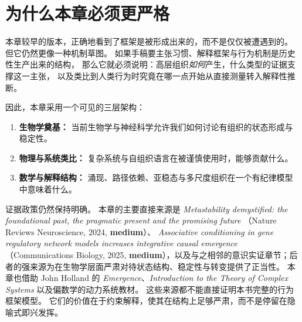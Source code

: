 \section{为什么本章必须更严格}

本章较早的版本，正确地看到了框架是被形成出来的，而不是仅仅被遭遇到的。
但它仍然更像一种机制草图。
如果手稿要主张习惯、解释框架与行为机制是历史性生产出来的结构，
那么它就必须说明：高层组织\emph{如何}产生，什么类型的证据支撑这一主张，
以及类比到人类行为时究竟在哪一点开始从直接测量转入解释性推断。

因此，本章采用一个可见的三层架构：
\begin{enumerate}[nosep]
  \item \textbf{生物学奠基：} 当前生物学与神经科学允许我们如何讨论有组织的状态形成与稳定性。
  \item \textbf{物理与系统类比：} 复杂系统与自组织语言在被谨慎使用时，能够贡献什么。
  \item \textbf{数学与解释结构：} 涌现、路径依赖、亚稳态与多尺度组织在一个有纪律模型中意味着什么。
\end{enumerate}

证据政策仍然保持明确。
本章的主要直接来源是
\emph{Metastability demystified: the foundational past, the pragmatic present and the promising future}
（Nature Reviews Neuroscience, 2024, \textbf{medium}）、
\emph{Associative conditioning in gene regulatory network models increases integrative causal emergence}
（Communications Biology, 2025, \textbf{medium}），以及与之相邻的意识实证章节；后者的强来源为在生物学层面严肃对待状态结构、稳定性与转变提供了正当性。
本章也借助 John Holland 的 \emph{Emergence}、\emph{Introduction to the Theory of Complex Systems}
以及偏数学的动力系统教材。
这些来源都不能直接证明本书完整的行为框架模型。
它们的价值在于约束解释，使其在结构上足够严肃，而不是停留在隐喻式即兴发挥。